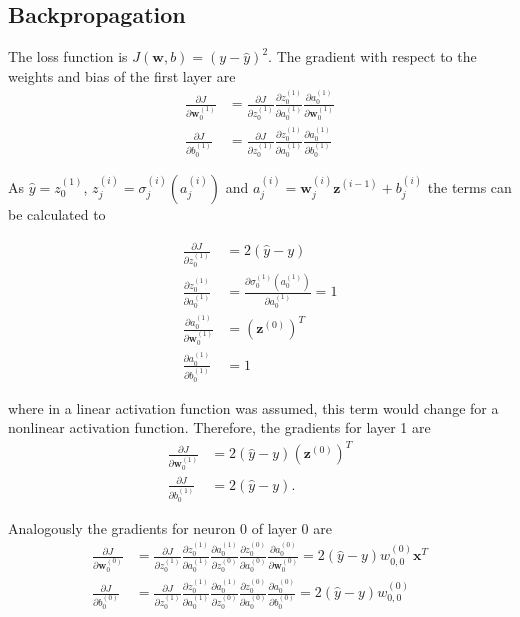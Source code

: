 \documentclass[12pt,a4paper]{scrartcl}
\newcommand{\matr}[1]{\mathbf{#1}}
\begin{document}
	\subsection*{Backpropagation}
	
	The loss function is $J\left(\matr{w}, b\right)= \left(y-\hat{y}\right)^2$. 
	The gradient with respect to the weights and bias of the first layer are
	\begin{align}
		\frac{\partial J}{\partial \matr{w}_0^{(1)}} &= \frac{\partial J}{\partial z_0^{(1)}} \frac{\partial z_0^{(1)}}{\partial a_0^{(1)}} \frac{\partial a_0^{(1)}}{\partial \matr{w}_0^{(1)}} \\
		\frac{\partial J}{\partial {b}_0^{(1)}} &= \frac{\partial J}{\partial z_0^{(1)}} \frac{\partial z_0^{(1)}}{\partial a_0^{(1)}} \frac{\partial a_0^{(1)}}{\partial {b}_0^{(1)}} 
	\end{align}

	As $\hat{y} = z_0^{(1)}$, $z_j^{(i)} = \sigma_j^{(i)}\left(a_j^{(i)}\right)$ and $a_j^{(i)} = \matr{w}_j^{(i)} \matr{z}^{(i-1)} + b_j^{(i)}$ the terms can be calculated to
	
	\begin{align}
		\frac{\partial J}{\partial z_0^{(1)}} &= 2\left(\hat{y}- y\right) \\
		\frac{\partial z_0^{(1)}}{\partial a_0^{(1)}} &= \frac{\partial \sigma_0^{(1)}\left(a_0^{(1)}\right)}{\partial a_0^{(1)}} = 1 \label{eq:nonlinearity} \\
		\frac{\partial a_0^{(1)}}{\partial \matr{w}_0^{(1)}} &= \left(\matr{z}^{(0)}\right)^T \\
		\frac{\partial a_0^{(1)}}{\partial {b}_0^{(1)}}  &= 1
	\end{align}
	
	where in  a linear activation function was assumed, this term would change for a nonlinear activation function.
	Therefore, the gradients for layer 1 are
	\begin{align}
		\frac{\partial J}{\partial \matr{w}_0^{(1)}} &= 2\left(\hat{y}- y\right) \left(\matr{z}^{(0)}\right)^T \\
		\frac{\partial J}{\partial {b}_0^{(1)}} &= 2\left(\hat{y}- y\right).
	\end{align}
	
	Analogously the gradients for neuron $0$ of layer 0 are
	\begin{align}
		\frac{\partial J}{\partial \matr{w}_0^{(0)}} &= \frac{\partial J}{\partial z_0^{(1)}}\frac{\partial z_0^{(1)}}{\partial a_0^{(1)}} \frac{\partial a_0^{(1)}}{\partial z_0^{(0)}} \frac{\partial z_0^{(0)}}{\partial a_0^{(0)}}\frac{\partial a_0^{(0)}}{\partial \matr{w}_0^{(0)}} = 2\left(\hat{y}- y\right) w_{0,0}^{(0)} \matr{x}^T \\
		\frac{\partial J}{\partial {b}_0^{(0)}} &= \frac{\partial J}{\partial z_0^{(1)}}\frac{\partial z_0^{(1)}}{\partial a_0^{(1)}} \frac{\partial a_0^{(1)}}{\partial z_0^{(0)}} \frac{\partial z_0^{(0)}}{\partial a_0^{(0)}}\frac{\partial a_0^{(0)}}{\partial {b}_0^{(0)}} =2\left(\hat{y}- y\right) w_{0,0}^{(0)}
	\end{align}
	
\end{document}
